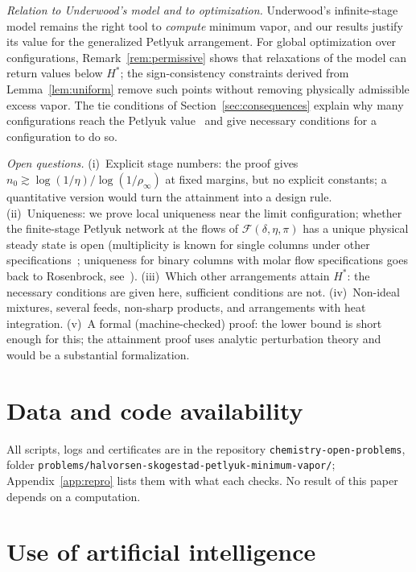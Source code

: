 \documentclass[11pt,a4paper]{report}
\newcommand{\cF}{\mathcal F}
\newcommand{\Hs}{H^{*}}
\begin{document}
\emph{Relation to Underwood's model and to optimization.} Underwood's infinite-stage model remains the right tool to
\emph{compute} minimum vapor, and our results justify its value for the generalized Petlyuk arrangement. For global
optimization over configurations, Remark~\ref{rem:permissive} shows that relaxations of the model can return values below
\(\Hs\); the sign-consistency constraints derived from Lemma~\ref{lem:uniform} remove such points without removing physically
admissible excess vapor. The tie conditions of Section~\ref{sec:consequences} explain why many configurations reach the
Petlyuk value~\autocite{Jiang2018} and give necessary conditions for a configuration to do so.

\emph{Open questions.} (i)~Explicit stage numbers: the proof gives \(n_0\gtrsim\log(1/\eta)/\log(1/\rho_\infty)\) at fixed margins,
but no explicit constants; a quantitative version would turn the attainment into a design rule. (ii)~Uniqueness: we prove
local uniqueness near the limit configuration; whether the finite-stage Petlyuk network at the flows of
\(\cF(\delta,\eta,\pi)\) has a unique physical steady state is open (multiplicity is known for single columns under other
specifications~\autocite{JacobsenSkogestad1991}; uniqueness for binary columns with molar flow specifications goes back to
Rosenbrock, see~\autocite{DohertyPerkins1982}). (iii)~Which other arrangements attain \(\Hs\): the necessary conditions are
given here, sufficient conditions are not. (iv)~Non-ideal mixtures, several feeds, non-sharp products, and arrangements with
heat integration. (v)~A formal (machine-checked) proof: the lower bound is short enough for this; the attainment proof uses
analytic perturbation theory and would be a substantial formalization.

\section*{Data and code availability}

All scripts, logs and certificates are in the repository \texttt{chemistry-open-problems}, folder
\texttt{problems/halvorsen-skogestad-petlyuk-minimum-vapor/}; Appendix~\ref{app:repro} lists them with what each checks.
No result of this paper depends on a computation.

\section*{Use of artificial intelligence}
\end{document}

